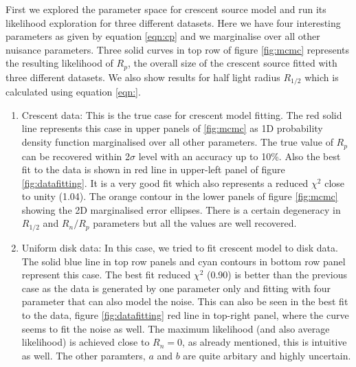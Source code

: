 First we explored the parameter space for crescent source model and run its likelihood exploration for three different datasets. Here we have four interesting parameters as given by equation \ref{eqn:cp} and we marginalise over all other nuisance parameters. Three solid curves in top row of figure \ref{fig:mcmc} represents the resulting likelihood of $R_p$, the overall size of the crescent source fitted with three different datasets. We also show results for half light radius $R_{1/2}$ which is calculated using equation \ref{eqn:}.

\begin{enumerate}

\item Crescent data: This is the true case for crescent model fitting. The red solid line represents this case in upper panels of \ref{fig:mcmc} as 1D probability density function marginalised over all other parameters. The true value of $R_p$ can be recovered within 2$\sigma$ level with an accuracy up to 10\%. Also the best fit to the data is shown in red line in upper-left panel of figure \ref{fig:datafitting}. It is a very good fit which also represents a reduced $\chi^2$ close to unity (1.04). The orange contour in the lower panels of figure \ref{fig:mcmc} showing the 2D marginalised error ellipses. There is a certain degeneracy in $R_{1/2}$ and $R_n/R_p$ parameters but all the values are well recovered. 

\item Uniform disk data: In this case, we tried to fit crescent model to disk data. The solid blue line in top row panels and cyan contours in bottom row panel represent this case. The best fit reduced $\chi^2$ (0.90) is better than the previous case as the data is generated by one parameter only and fitting with four parameter that can also model the noise. This can also be seen in the best fit to the data, figure \ref{fig:datafitting} red line in top-right panel, where the curve seems to fit the noise as well. The maximum likelihood (and also average likelihood) is achieved close to $R_n = 0$, as already mentioned, this is intuitive as well. The other paramters, $a$ and $b$ are quite arbitary and highly uncertain. 


\end{enumerate}
